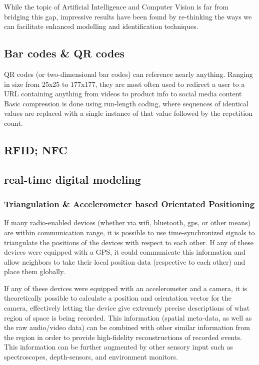 \documentclass[a4paper,12pt]{report}
\begin{document}
While the topic of Artificial Intelligence and Computer Vision is far from bridging this gap, impressive results have been found by re-thinking the ways we can facilitate enhanced modelling and identification techniques.

\subsection{Bar codes \& QR codes}
QR codes (or two-dimensional bar codes) can reference nearly anything. Ranging in size from 25x25 to 177x177, they are most often used to redirect a user to a URL containing anything from videos to product info to social media content \cite{6182398}
Basic compression is done using run-length coding, where sequences of identical values are replaced with a single instance of that value followed by the repetition count. \cite{6182398}
\subsection{RFID; NFC}
\cite{5340296}
\subsection{real-time digital modeling}

\subsubsection{Triangulation \& Accelerometer based Orientated Positioning}

If many radio-enabled devices (whether via wifi, bluetooth, gps, or other means) are within communication range, it is possible to use time-synchronized signals to triangulate the positions of the devices with respect to each other. If any of these devices were equipped with a GPS, it could communicate this information and allow neighbors to take their local position data (respective to each other) and place them globally.

If any of these devices were equipped with an accelerometer and a camera, it is theoretically possible to calculate a position and orientation vector for the camera, effectively letting the device give extremely precise descriptions of what region of space is being recorded. This information (spatial meta-data, as well as the raw audio/video data) can be combined with other similar information from the region in order to provide high-fidelity reconstructions of recorded events. This information can be further augmented by other sensory input such as spectroscopes, depth-sensors, and environment monitors.
\end{document}
